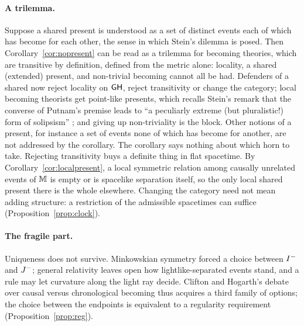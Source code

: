 \paragraph{A trilemma.} Suppose a shared present is understood as a set of
distinct events each of which has become for each other, the sense in which
Stein's dilemma is posed. Then Corollary~\ref{cor:nopresent} can be read as a
trilemma for becoming theories, which are transitive by definition, defined from the metric alone: locality, a
shared (extended) present, and non-trivial becoming cannot all be had. Defenders of a shared now reject locality on $\mathsf{GH}$, reject transitivity or change the category; local becoming theorists get
point-like presents, which recalls Stein's remark that the converse of
Putnam's premise leads to ``a peculiarly extreme (but pluralistic!) form of
solipsism'' \citep[p.~18]{Stein1968}; and giving up non-triviality is the
block. Other notions of a present, for instance a set of events none of which
has become for another, are not addressed by the corollary. The corollary
says nothing about which horn to take. Rejecting transitivity buys a definite
thing in flat spacetime. By Corollary~\ref{cor:localpresent}, a local
symmetric relation among causally unrelated events of $\mathbb M$ is empty or is
spacelike separation itself, so the only local shared present there is the
whole elsewhere. Changing the category need not mean adding structure: a
restriction of the admissible spacetimes can suffice
(Proposition~\ref{prop:clock}).

\paragraph{The fragile part.} Uniqueness does not survive. Minkowskian
symmetry forced a choice between $I^{-}$ and $J^{-}$; general relativity leaves
open how lightlike-separated events stand, and a rule may let curvature along
the light ray decide. Clifton and Hogarth's debate over causal versus
chronological becoming \citep[pp.~364--365]{CH1995} thus acquires a third
family of options; the choice between the endpoints is equivalent to a
regularity requirement (Proposition~\ref{prop:reg}).

